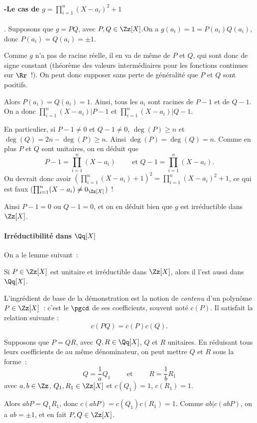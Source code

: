 {{  \medskip
  \paragraph{-Le cas de $g=\prod_{i=1}^{n}(X-a_{i})^{2}+1$}. Supposons que $g=PQ$,
  avec $P,Q\in\Zz[X]$.On a $g(a_{i})=1=P(a_{i})Q(a_{i})$, donc
  $P(a_{i})=Q(a_{i})=\pm1$.

  Comme $g$ n'a pas de racine réelle, il en va de même de $P$ et $Q$, qui
  sont donc de signe constant (théorème des valeurs intermédiaires pour
  les fonctions continues sur $\Rr$~!). On peut donc supposer sans perte
  de généralité que $P$ et $Q$ sont positifs.

  Alors $P(a_{i})=Q(a_{i})=1$. Ainsi, tous les $a_{i}$ sont racines de
  $P-1$ et de $Q-1$. On a donc $\prod_{i=1}^{n}(X-a_{i})|P-1$ et
  $\prod_{i=1}^{n}(X-a_{i})|Q-1$.

  En particulier, si $P-1\neq0$ et $Q-1\neq0$, $\deg(P)\geq n$ et
  $\deg(Q)=2n-\deg(P)\geq n$. Ainsi $\deg(P)=\deg(Q)=n$. Comme en plus
  $P$ et $Q$ sont unitaires, on en déduit que 
  $$
    P-1=\prod_{i=1}^{n}(X-a_{i}) \qquad\text{ et }
    Q-1=\prod_{i=1}^{n}(X-a_{i}).
  $$
  On devrait donc avoir
  $(\prod_{i=1}^{n}(X-a_{i})+1)^{2}=\prod_{i=1}^{n}(X-a_{i})^{2}+1$, ce
  qui est faux ($\prod_{i=1}^{n}(X-a_{i})\neq 0_{\Zz[X]}$)~!

  Ainsi $P-1=0$ ou $Q-1=0$, et on en déduit bien que $g$ est irréductible
  dans $\Zz[X]$.


  
  \bigskip
  \paragraph{Irréductibilité dans $\Qq[X]$}
 On a le lemme suivant~:

  Si $P\in\Zz[X]$ est unitaire et irréductible dans $\Zz[X]$, alors il
  l'est aussi dans $\Qq[X]$.

  L'ingrédient de base de la démonstration est la notion de
  \emph{contenu} d'un polynôme $P\in\Zz[X]$~: c'est le $\pgcd$ de ses
  coefficients, souvent noté $c(P)$. Il satisfait la relation suivante :
  $$
    c(PQ)=c(P)c(Q).
  $$

  Supposons que $P=QR$, avec $Q,R\in\Qq[X]$, $Q$ et $R$ unitaires. En
  réduisant tous leurs coefficients de au même dénominateur, on peut
  mettre $Q$ et $R$ sous la forme~:
  $$
    Q=\frac{1}{a}Q_{1} 
    \qquad\text{ et }\qquad
    R=\frac{1}{b}R_{1} 
  $$
  avec $a,b\in\Zz$, $Q_{1},R_{1}\in\Zz[X]$ et $c(Q_{1})=1$, $c(R_{1})=1$.

  Alors $abP=Q_{1}R_{1}$, donc $c(abP)=c(Q_{1})c(R_{1})=1$. Comme
  $ab|c(abP)$, on a $ab=\pm1$, et en fait $P,Q\in\Zz[X]$.
}
}
